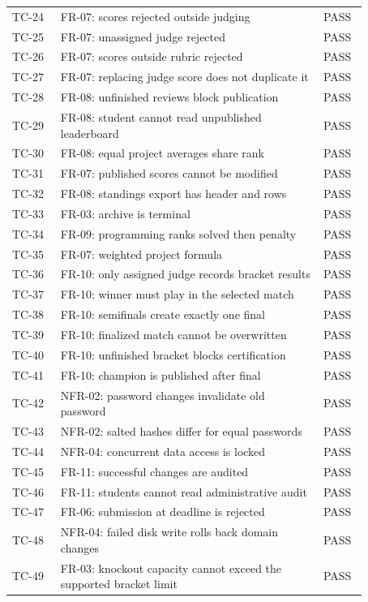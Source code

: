 \begin{longtable}{p{0.12\linewidth}p{0.65\linewidth}p{0.1\linewidth}}
TC-24 & FR-07: scores rejected outside judging & PASS\\
TC-25 & FR-07: unassigned judge rejected & PASS\\
TC-26 & FR-07: scores outside rubric rejected & PASS\\
TC-27 & FR-07: replacing judge score does not duplicate it & PASS\\
TC-28 & FR-08: unfinished reviews block publication & PASS\\
TC-29 & FR-08: student cannot read unpublished leaderboard & PASS\\
TC-30 & FR-08: equal project averages share rank & PASS\\
TC-31 & FR-07: published scores cannot be modified & PASS\\
TC-32 & FR-08: standings export has header and rows & PASS\\
TC-33 & FR-03: archive is terminal & PASS\\
TC-34 & FR-09: programming ranks solved then penalty & PASS\\
TC-35 & FR-07: weighted project formula & PASS\\
TC-36 & FR-10: only assigned judge records bracket results & PASS\\
TC-37 & FR-10: winner must play in the selected match & PASS\\
TC-38 & FR-10: semifinals create exactly one final & PASS\\
TC-39 & FR-10: finalized match cannot be overwritten & PASS\\
TC-40 & FR-10: unfinished bracket blocks certification & PASS\\
TC-41 & FR-10: champion is published after final & PASS\\
TC-42 & NFR-02: password changes invalidate old password & PASS\\
TC-43 & NFR-02: salted hashes differ for equal passwords & PASS\\
TC-44 & NFR-04: concurrent data access is locked & PASS\\
TC-45 & FR-11: successful changes are audited & PASS\\
TC-46 & FR-11: students cannot read administrative audit & PASS\\
TC-47 & FR-06: submission at deadline is rejected & PASS\\
TC-48 & NFR-04: failed disk write rolls back domain changes & PASS\\
TC-49 & FR-03: knockout capacity cannot exceed the supported bracket limit & PASS\\

\end{longtable}
